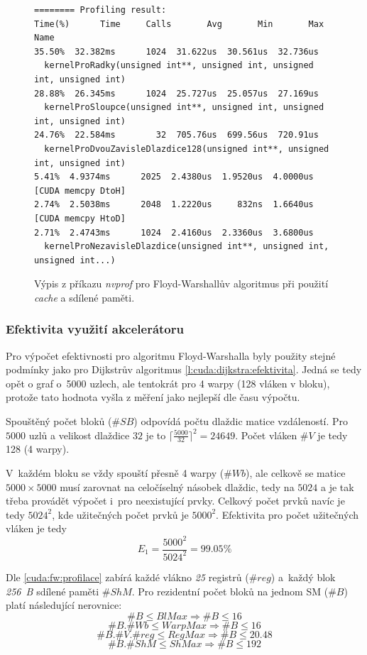 \begin{figure}
	\centering
	\begin{verbatim}
======== Profiling result:
Time(%)      Time     Calls       Avg       Min       Max  Name
35.50%  32.382ms      1024  31.622us  30.561us  32.736us
  kernelProRadky(unsigned int**, unsigned int, unsigned int, unsigned int)
28.88%  26.345ms      1024  25.727us  25.057us  27.169us
  kernelProSloupce(unsigned int**, unsigned int, unsigned int, unsigned int)
24.76%  22.584ms        32  705.76us  699.56us  720.91us
  kernelProDvouZavisleDlazdice128(unsigned int**, unsigned int, unsigned int)
5.41%  4.9374ms      2025  2.4380us  1.9520us  4.0000us  [CUDA memcpy DtoH]
2.74%  2.5038ms      2048  1.2220us     832ns  1.6640us  [CUDA memcpy HtoD]
2.71%  2.4743ms      1024  2.4160us  2.3360us  3.6800us
  kernelProNezavisleDlazdice(unsigned int**, unsigned int, unsigned int...)
	\end{verbatim}
	\caption{Výpis z příkazu \emph{nvprof} pro Floyd-Warshallův algoritmus při použití \emph{cache} a sdílené paměti.}
    \label{f:cuda:floyd:profilace2}
\end{figure}

\subsubsection{Efektivita využití akcelerátoru} \label{l:cuda:floyd:efektivita}
Pro výpočet efektivnosti pro algoritmu Floyd-Warshalla byly použity stejné podmínky jako pro Dijkstrův algoritmus \ref{l:cuda:dijkstra:efektivita}. Jedná se tedy opět o graf o~5000 uzlech, ale tentokrát pro 4 warpy (128 vláken v bloku), protože tato hodnota vyšla z měření jako nejlepší dle času výpočtu.

Spouštěný počet bloků ($\#SB$) odpovídá počtu dlaždic matice vzdáleností. Pro $5000$ uzlů a velikost dlaždice $32$ je to 
$\lceil \frac{5000}{32} \rceil ^ 2 = 24649$. Počet vláken $\#V$ je tedy 128 (4 warpy).

V~každém bloku se vždy spouští přesně 4 warpy ($ \#Wb $), ale celkově se matice $5000 \times 5000$ musí zarovnat na celočíselný násobek
dlaždic, tedy na $5024$ a je tak třeba provádět výpočet i~pro neexistující prvky. Celkový počet prvků navíc je tedy $ 5024^2 $, kde 
užitečných počet prvků je $ 5000^2 $. Efektivita pro počet užitečných vláken je tedy
$$ E_1 = \frac{5000^2}{5024^2} = 99.05 \% $$


Dle \ref{cuda:fw:profilace} zabírá každé vlákno \emph{25} registrů ($\#reg$) a~každý blok \emph{256~B} sdílené paměti $\#ShM$. Pro rezidentní počet 
bloků na jednom SM ($\#B$)  platí následující nerovnice:
$$               \#B \leq BlMax   \Rightarrow  \#B \leq 16    $$
$$        \#B . \#Wb \leq WarpMax \Rightarrow  \#B \leq 16    $$
$$ \#B . \#V . \#reg \leq RegMax  \Rightarrow  \#B \leq 20.48 $$
$$       \#B . \#ShM \leq ShMax   \Rightarrow  \#B \leq 192   $$

